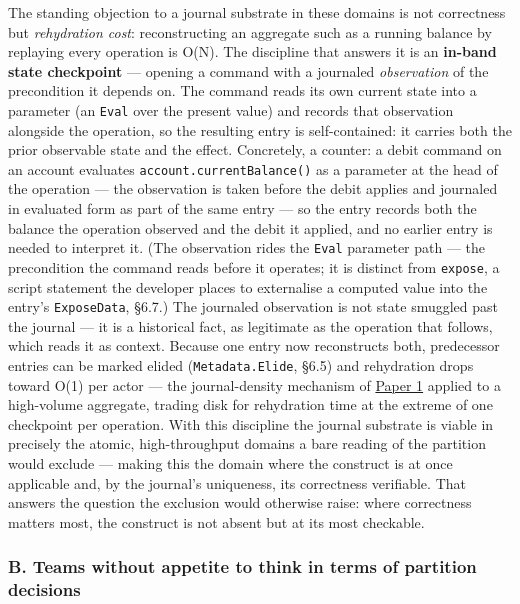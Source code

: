 \documentclass[
]{article}
\let\origtexttt\texttt%
\renewcommand{\texttt}[1]{\origtexttt{\seqsplit{#1}}}%
\let\texttt\origtexttt%
\begin{document}
The standing objection to a journal substrate in these domains is not
correctness but \emph{rehydration cost}: reconstructing an aggregate
such as a running balance by replaying every operation is O(N). The
discipline that answers it is an \textbf{in-band state checkpoint} ---
opening a command with a journaled \emph{observation} of the
precondition it depends on. The command reads its own current state into
a parameter (an \texttt{Eval} over the present value) and records that
observation alongside the operation, so the resulting entry is
self-contained: it carries both the prior observable state and the
effect. Concretely, a counter: a debit command on an account evaluates
\texttt{account.currentBalance()} as a parameter at the head of the
operation --- the observation is taken before the debit applies and
journaled in evaluated form as part of the same entry --- so the entry
records both the balance the operation observed and the debit it
applied, and no earlier entry is needed to interpret it. (The
observation rides the \texttt{Eval} parameter path --- the precondition
the command reads before it operates; it is distinct from
\texttt{expose}, a script statement the developer places to externalise
a computed value into the entry's \texttt{ExposeData}, §6.7.) The
journaled observation is not state smuggled past the journal --- it is a
historical fact, as legitimate as the operation that follows, which
reads it as context. Because one entry now reconstructs both,
predecessor entries can be marked elided (\texttt{Metadata.Elide}, §6.5)
and rehydration drops toward O(1) per actor --- the journal-density
mechanism of \href{01-anti-porosity.md}{Paper 1} applied to a
high-volume aggregate, trading disk for rehydration time at the extreme
of one checkpoint per operation. With this discipline the journal
substrate is viable in precisely the atomic, high-throughput domains a
bare reading of the partition would exclude --- making this the domain
where the construct is at once applicable and, by the journal's
uniqueness, its correctness verifiable. That answers the question the
exclusion would otherwise raise: where correctness matters most, the
construct is not absent but at its most checkable.

\subsubsection{B. Teams without appetite to think in terms of partition
decisions}\label{b.-teams-without-appetite-to-think-in-terms-of-partition-decisions}
\end{document}
